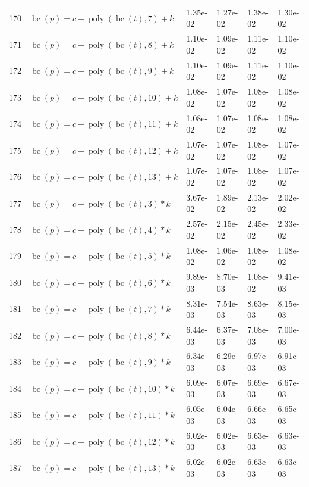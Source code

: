 \documentclass[12pt,a4paper]{article}
\DeclareMathOperator{\bc}{bc}
\DeclareMathOperator{\poly}{poly}
\begin{document}
\begin{longtable}[t]{ll>{\raggedleft\arraybackslash}p{2cm}>{\raggedleft\arraybackslash}p{2cm}>{\raggedleft\arraybackslash}p{2cm}>{\raggedleft\arraybackslash}p{2cm}}
170 & $\bc(p) = c + \poly\left( \bc(t), 7 \right) + k$ & 1.35e-02 & 1.27e-02 & 1.38e-02 & 1.30e-02\\
\rowcolor{gray!6}  171 & $\bc(p) = c + \poly\left( \bc(t), 8 \right) + k$ & 1.10e-02 & 1.09e-02 & 1.11e-02 & 1.10e-02\\
172 & $\bc(p) = c + \poly\left( \bc(t), 9 \right) + k$ & 1.10e-02 & 1.09e-02 & 1.11e-02 & 1.10e-02\\
\rowcolor{gray!6}  173 & $\bc(p) = c + \poly\left( \bc(t), 10 \right) + k$ & 1.08e-02 & 1.07e-02 & 1.08e-02 & 1.08e-02\\
174 & $\bc(p) = c + \poly\left( \bc(t), 11 \right) + k$ & 1.08e-02 & 1.07e-02 & 1.08e-02 & 1.08e-02\\
\rowcolor{gray!6}  175 & $\bc(p) = c + \poly\left( \bc(t), 12 \right) + k$ & 1.07e-02 & 1.07e-02 & 1.08e-02 & 1.07e-02\\
176 & $\bc(p) = c + \poly\left( \bc(t), 13 \right) + k$ & 1.07e-02 & 1.07e-02 & 1.08e-02 & 1.07e-02\\
\rowcolor{gray!6}  177 & $\bc(p) = c + \poly\left( \bc(t), 3 \right) * k$ & 3.67e-02 & 1.89e-02 & 2.13e-02 & 2.02e-02\\
178 & $\bc(p) = c + \poly\left( \bc(t), 4 \right) * k$ & 2.57e-02 & 2.15e-02 & 2.45e-02 & 2.33e-02\\
\rowcolor{gray!6}  179 & $\bc(p) = c + \poly\left( \bc(t), 5 \right) * k$ & 1.08e-02 & 1.06e-02 & 1.08e-02 & 1.08e-02\\
180 & $\bc(p) = c + \poly\left( \bc(t), 6 \right) * k$ & 9.89e-03 & 8.70e-03 & 1.08e-02 & 9.41e-03\\
\rowcolor{gray!6}  181 & $\bc(p) = c + \poly\left( \bc(t), 7 \right) * k$ & 8.31e-03 & 7.54e-03 & 8.63e-03 & 8.15e-03\\
182 & $\bc(p) = c + \poly\left( \bc(t), 8 \right) * k$ & 6.44e-03 & 6.37e-03 & 7.08e-03 & 7.00e-03\\
\rowcolor{gray!6}  183 & $\bc(p) = c + \poly\left( \bc(t), 9 \right) * k$ & 6.34e-03 & 6.29e-03 & 6.97e-03 & 6.91e-03\\
184 & $\bc(p) = c + \poly\left( \bc(t), 10 \right) * k$ & 6.09e-03 & 6.07e-03 & 6.69e-03 & 6.67e-03\\
\rowcolor{gray!6}  185 & $\bc(p) = c + \poly\left( \bc(t), 11 \right) * k$ & 6.05e-03 & 6.04e-03 & 6.66e-03 & 6.65e-03\\
186 & $\bc(p) = c + \poly\left( \bc(t), 12 \right) * k$ & 6.02e-03 & 6.02e-03 & 6.63e-03 & 6.63e-03\\
\rowcolor{gray!6}  187 & $\bc(p) = c + \poly\left( \bc(t), 13 \right) * k$ & 6.02e-03 & 6.02e-03 & 6.63e-03 & 6.63e-03\\

\end{longtable}
\end{document}
